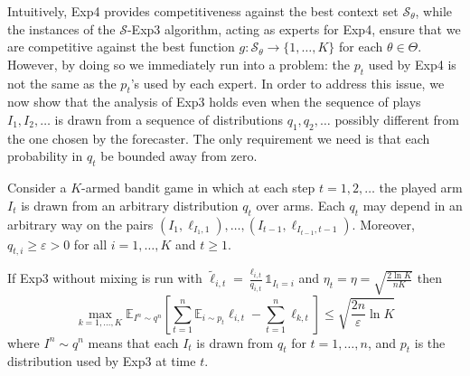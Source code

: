 \documentclass[11pt]{hackednow}
\newcommand{\E}{\mathbb{E}}
\newcommand{\cS}{\mathcal{S}}
\def\ds1{\mathds{1}}
\renewcommand{\tilde}{\widetilde}
\newcommand{\ve}{\varepsilon}
\begin{document}
Intuitively, Exp4 provides competitiveness against the best context set $\cS_{\theta}$, while the instances of the $\cS$-Exp3 algorithm, acting as experts for Exp4, ensure that we are competitive against the best function $g : \cS_{\theta} \to \{1,\dots,K\}$ for each $\theta\in\Theta$. However, by doing so we immediately run into a problem: the $p_t$ used by Exp4 is not the same as the $p_t$'s used by each expert. In order to address this issue, we now show that the analysis of Exp3 holds even when the sequence of plays $I_1,I_2,\dots$ is drawn from a sequence of distributions $q_1,q_2,\dots$ possibly different from the one chosen by the forecaster. The only requirement we need is that each probability in $q_t$ be bounded away from zero.
%
\begin{theorem}
\label{th:exp3-rebel}
Consider a $K$-armed bandit game in which at each step $t=1,2,\dots$ the played arm $I_t$ is drawn from an arbitrary distribution $q_t$ over arms. Each $q_t$ may depend in an arbitrary way on the pairs $(I_1,\ell_{I_1,1}),\dots,(I_{t-1},\ell_{I_{t-1},t-1})$. Moreover, $q_{t,i} \ge \ve > 0$ for all $i=1,\dots,K$ and $t \ge 1$.

If Exp3 without mixing is run with $\tilde{\ell}_{i,t} = \frac{\ell_{i,t}}{q_{i,t}} \ds1_{I_t = i}$ and $\eta_t = \eta = \sqrt{\frac{2\ln K}{n K}}$ then
\begin{equation}
    \max_{k=1,\dots,K} \E_{I^n \sim q^n} \left[ \sum_{t=1}^n \E_{i \sim p_t} \ell_{i,t} - \sum_{t=1}^n \ell_{k,t} \right] \le
    \sqrt{\frac{2 n}{\ve}\ln K}
\end{equation}
where $I^n \sim q^n$ means that each $I_t$ is drawn from $q_t$ for $t=1,\dots,n$, and $p_t$ is the distribution used by Exp3 at time $t$.
\end{theorem}
%
\end{document}
